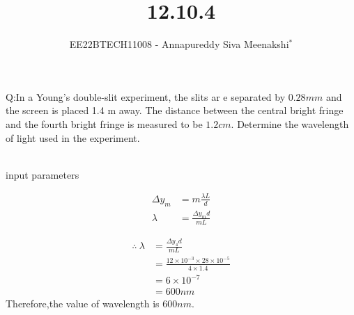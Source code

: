\documentclass[journal,12pt,onecolumn]{IEEEtran}
\theoremstyle{remark}
\begin{document}

\vspace{3cm}

\title{12.10.4}
\author{EE22BTECH11008 - Annapureddy Siva Meenakshi$^{*}$%
}
\maketitle
\bigskip

\renewcommand{\thefigure}{\theenumi}
\renewcommand{\thetable}{\theenumi}
Q:In a Young's double-slit experiment, the slits ar e separated by
$0.28 mm$ and the screen is placed 1.4 m away. The distance between
the central bright fringe and the fourth bright fringe is measured
to be $1.2 cm$. Determine the wavelength of light used in the
experiment.
\\\solution\\
\begin{table}[!ht]
    \centering
        
    \caption{input parameters}
    \label{tab:12_10_4_1}
\end{table}
\begin{align}
\Delta y_m &= m \frac{\lambda L}{d} \\
\lambda&=\frac {\Delta y_m d}{mL}
\end{align}

\begin{align}
  \therefore\ \lambda&=\frac {\Delta y_4 d}{mL}\\
&=\frac{12\times 10^{-3}\times28 \times 10^{-5}}{4\times1.4}\\
&=6\times 10^{-7}\\
&=600nm
\end{align}
Therefore,the value of wavelength is $600nm$.
\end{document}
